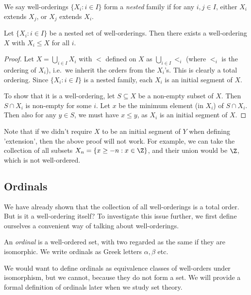 \documentclass[a4paper]{article}
\begin{document}
\begin{defi}
  We say well-orderings $\{X_i: i\in I\}$ form a \emph{nested} family if for any $i, j\in I$, either $X_i$ extends $X_j$, or $X_j$ extends $X_i$.
\end{defi}

\begin{prop}
  Let $\{X_i: i\in I\}$ be a nested set of well-orderings. Then there exists a well-ordering $X$ with $X_i\leq X$ for all $i$.
\end{prop}

\begin{proof}
  Let $X = \bigcup_{i\in I}X_i$ with $<$ defined on $X$ as $\bigcup_{i\in I} <_i$ (where $<_i$ is the ordering of $X_i$), i.e.\ we inherit the orders from the $X_i$'s. This is clearly a total ordering. Since $\{X_i: i \in I\}$ is a nested family, each $X_i$ is an initial segment of $X$.

  To show that it is a well-ordering, let $S\subseteq X$ be a non-empty subset of $X$. Then $S\cap X_i$ is non-empty for some $i$. Let $x$ be the minimum element (in $X_i$) of $S\cap X_i$. Then also for any $y\in S$, we must have $x \leq y$, as $X_i$ is an initial segment of $X$.
\end{proof}
Note that if we didn't require $X$ to be an initial segment of $Y$ when defining 'extension', then the above proof will not work. For example, we can take the collection of all subsets $X_n = \{x \geq -n: x\in \Z\}$, and their union would be $\Z$, which is not well-ordered.

\subsection{Ordinals}
We have already shown that the collection of all well-orderings is a total order. But is it a well-ordering itself? To investigate this issue further, we first define ourselves a convenient way of talking about well-orderings.

\begin{defi}[Ordinal]
  An \emph{ordinal} is a well-ordered set, with two regarded as the same if they are isomorphic. We write ordinals as Greek letters $\alpha, \beta$ etc.
\end{defi}
We would want to define ordinals as equivalence classes of well-orders under isomorphism, but we cannot, because they do not form a set. We will provide a formal definition of ordinals later when we study set theory.
\end{document}
